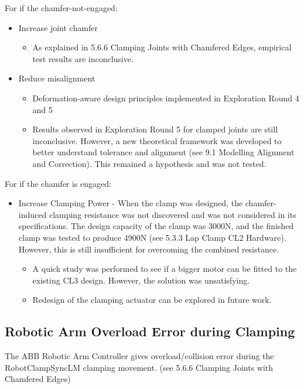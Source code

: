 For if the chamfer-not-engaged:
\begin{itemize}
    \item Increase joint chamfer
    \begin{itemize}
        \item As explained in 5.6.6 Clamping Joints with Chamfered Edges, empirical test results are inconclusive.
    \end{itemize}
    \item Reduce misalignment 
    \begin{itemize}
        \item Deformation-aware design principles implemented in Exploration Round 4 and 5
        \item Results observed in Exploration Round 5 for clamped joints are still inconclusive. However, a new theoretical framework was developed to better understand tolerance and alignment (see 9.1 Modelling Alignment and Correction). This remained a hypothesis and was not tested.
    \end{itemize}
\end{itemize}

For if the chamfer is engaged:
\begin{itemize}
    \item Increase Clamping Power - When the clamp was designed, the chamfer-induced clamping resistance was not discovered and was not considered in its specifications. The design capacity of the clamp was 3000N, and the finished clamp was tested to produce 4900N (see 5.3.3 Lap Clamp CL2 Hardware). However, this is still insufficient for overcoming the combined resistance.
    \begin{itemize}
        \item A quick study was performed to see if a bigger motor can be fitted to the existing CL3 design. However, the solution was unsatisfying.
        \item Redesign of the clamping actuator can be explored in future work.
    \end{itemize}
\end{itemize}

\subsection{Robotic Arm Overload Error during Clamping}
\label{subsection:exploration_2_robotic_arm_overload_error_during_clamping}

The ABB Robotic Arm Controller gives overload/collision error during the RobotClampSyncLM clamping movement. (see 5.6.6 Clamping Joints with Chamfered Edges)

